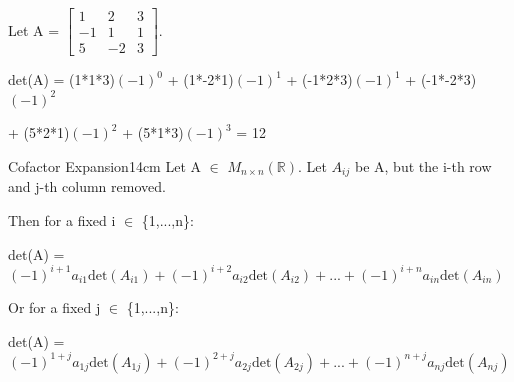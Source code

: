     \vspace{0.5cm}



    \begin{example}
        Let A =
        $
        \begin{bmatrix}
            1 & 2 & 3 \\
            -1 & 1 & 1 \\
            5 & -2 & 3 
        \end{bmatrix}
        $.

        det(A) =
        (1*1*3)$(-1)^0$
        + (1*-2*1)$(-1)^1$
        + (-1*2*3)$(-1)^1$
        + (-1*-2*3)$(-1)^2$

        \hspace{1.7cm}
        + (5*2*1)$(-1)^2$
        + (5*1*3)$(-1)^3$
        = 12
    \end{example}

    \newpage



    \begin{wtheorem}{Cofactor Expansion}{14cm}
        Let A $\in$ $M_{n \times n}(\mathbb{R})$.
        Let $A_{ij}$ be A, but the i-th row and j-th column removed.

        Then for a fixed i $\in$ \{1,...,n\}:

        \hspace{0.5cm}
        det(A) = $(-1)^{i+1}a_{i1}\text{det}(A_{i1})
                    + (-1)^{i+2}a_{i2}\text{det}(A_{i2})
                    + ... + (-1)^{i+n}a_{in}\text{det}(A_{in})$

        Or for a fixed j $\in$ \{1,...,n\}:

        \hspace{0.5cm}
        det(A) = $(-1)^{1+j}a_{1j}\text{det}(A_{1j})
                    + (-1)^{2+j}a_{2j}\text{det}(A_{2j})
                    + ... + (-1)^{n+j}a_{nj}\text{det}(A_{nj})$
    \end{wtheorem}

